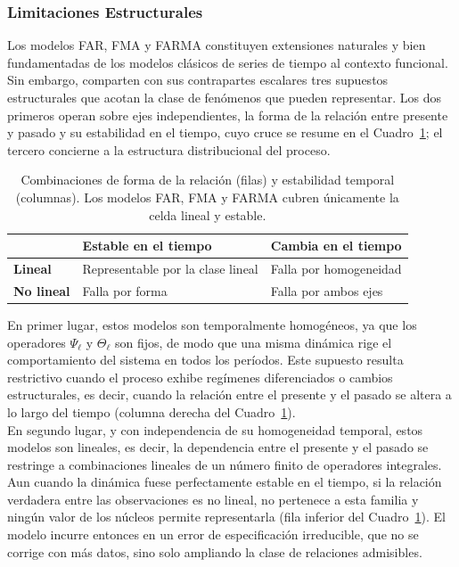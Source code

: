 \subsubsection{Limitaciones Estructurales}
\label{02_02_02_01_limitaciones_estructurales}
Los modelos FAR, FMA y FARMA constituyen extensiones naturales y bien fundamentadas de los modelos clásicos de series de tiempo al contexto funcional. Sin embargo, comparten con sus contrapartes escalares tres supuestos estructurales que acotan la clase de fenómenos que pueden representar. Los dos primeros operan sobre ejes independientes, la forma de la relación entre presente y pasado y su estabilidad en el tiempo, cuyo cruce se resume en el Cuadro~\ref{tab:limitaciones}; el tercero concierne a la estructura distribucional del proceso.

\begin{table}[ht]
\centering
\begin{tabular}{lll}
\hline
 & \textbf{Estable en el tiempo} & \textbf{Cambia en el tiempo} \\
\hline
\textbf{Lineal} & Representable por la clase lineal & Falla por homogeneidad \\
\textbf{No lineal} & Falla por forma & Falla por ambos ejes \\
\hline
\end{tabular}
\caption{Combinaciones de forma de la relación (filas) y estabilidad
temporal (columnas). Los modelos FAR, FMA y FARMA cubren únicamente la
celda lineal y estable.}
\label{tab:limitaciones}
\end{table}

En primer lugar, estos modelos son temporalmente homogéneos, ya que los operadores $\Psi_\ell$ y $\Theta_\ell$ son fijos, de modo que una misma dinámica rige el comportamiento del sistema en todos los períodos. Este supuesto resulta restrictivo cuando el proceso exhibe regímenes diferenciados o cambios estructurales, es decir, cuando la relación entre el presente y el pasado se altera a lo largo del tiempo (columna derecha del Cuadro~\ref{tab:limitaciones}).\\

En segundo lugar, y con independencia de su homogeneidad temporal, estos modelos son lineales, es decir, la dependencia entre el presente y el pasado se restringe a combinaciones lineales de un número finito de operadores integrales. Aun cuando la dinámica fuese perfectamente estable en el tiempo, si la relación verdadera entre las observaciones es no lineal, no pertenece a esta familia y ningún valor de los núcleos permite representarla (fila inferior del Cuadro~\ref{tab:limitaciones}). El modelo incurre entonces en un error de especificación irreducible, que no se corrige con más datos, sino solo ampliando la clase de relaciones admisibles.\\

